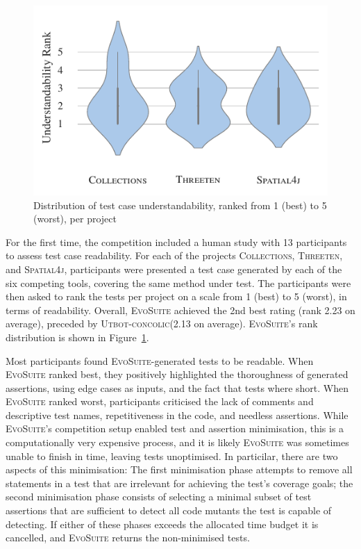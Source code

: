 \documentclass[10pt,conference]{IEEEtran}
\newcommand{\project}[1]{\textsc{#1}\xspace}
\newcommand{\Collections}{\project{Collections}}
\newcommand{\Threeten}{\project{Threeten}}
\newcommand{\Spatial}{\project{Spatial4j}}
\newcommand{\EVOSUITE}{\textsc{EvoSuite}\xspace}
\newcommand{\UtbotConcolic}{\textsc{Utbot-concolic}\xspace}
\begin{document}



\begin{figure}
  \includegraphics[width=\columnwidth]{./data/understandability}
  \caption{Distribution of test case understandability, ranked from 1 (best) to 5 (worst), per project}
  \label{fig:readability}
\end{figure}

For the first time, the competition included a human study with 13
participants to assess test case readability. For each of the projects \Collections,
\Threeten, and \Spatial, participants were presented a test case
generated by each of the six competing tools, covering the same method under
test. The participants were then asked to rank the tests per project
on a scale from 1 (best) to 5 (worst), in terms of readability. Overall,
\EVOSUITE achieved the 2nd best rating (rank 2.23 on average),
preceded by \UtbotConcolic (2.13 on average). \EVOSUITE's rank distribution
is shown in Figure~\ref{fig:readability}.

Most participants found \EVOSUITE-generated tests to be readable. When
\EVOSUITE ranked best, they positively highlighted the thoroughness of
generated assertions, using edge cases as inputs, and the fact that
tests where short. When \EVOSUITE ranked worst, participants
criticised the lack of comments and descriptive test names,
repetitiveness in the code, and needless assertions. While \EVOSUITE's
competition setup enabled test and assertion minimisation, this is a
computationally very expensive process, and it is likely \EVOSUITE was
sometimes unable to finish in time, leaving tests unoptimised. In
particilar, there are two aspects of this minimisation: The first
minimisation phase attempts to remove all statements in a test that
are irrelevant for achieving the test's coverage goals; the second
minimisation phase consists of selecting a minimal subset of test
assertions that are sufficient to detect all code mutants the test is
capable of detecting. If either of these phases exceeds the allocated
time budget it is cancelled, and \EVOSUITE returns the non-minimised
tests.
\end{document}
